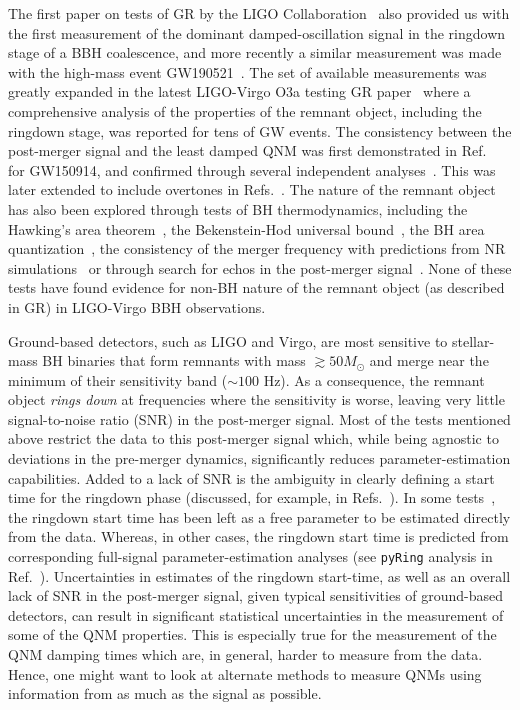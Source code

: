 \documentclass[twocolumn,prd,aps,superscriptaddress,preprintnumbers,tightenlines,showpacs,nofootinbib,eqsecnum,amsfonts,amsmath]{revtex4-1}
\begin{document}
The first paper on tests of GR by the LIGO Collaboration~\cite{TheLIGOScientific:2016src} also provided us with the first measurement of the dominant damped-oscillation signal in the ringdown stage of a BBH
coalescence, and more recently a similar measurement was made with the high-mass event GW190521~\cite{Abbott:2020tfl,Abbott:2020mjq}. The set of available measurements was greatly expanded in the latest LIGO-Virgo O3a testing GR paper~\cite{Abbott:2020jks} where a comprehensive analysis of the properties of the remnant object, including the ringdown stage, was reported for tens of GW events. The consistency between the post-merger signal and the least damped QNM was first demonstrated in
Ref.~\cite{TheLIGOScientific:2016src} for GW150914, and confirmed through several independent analyses~\cite{Brito:2018rfr,Carullo:2019flw,Isi:2019aib,CalderonBustillo:2020tjf}. This was later extended to include
overtones in Refs.~\cite{Giesler:2019uxc,Isi:2019aib,Abbott:2020jks}.  The nature of the remnant object has also been explored through tests of BH thermodynamics, including the Hawking's area
theorem~\cite{Cabero:2017avf,Isi:2020tac}, the Bekenstein-Hod universal bound~\cite{Carullo:2021yxh}, the BH area quantization~\cite{Foit:2016uxn,Laghi:2020rgl}, the consistency of the merger frequency with predictions from NR simulations~\cite{Carullo:2018gah} or through search for echos in the post-merger signal~\cite{Nielsen:2018lkf,Tsang:2019zra,Lo:2018sep,Abedi:2018npz,Abedi:2020sgg,Testa:2018bzd}.  None of these tests have found evidence for non-BH nature of the remnant
object (as described in GR) in LIGO-Virgo BBH observations.

Ground-based detectors, such as LIGO and Virgo, are most sensitive to
stellar-mass BH binaries that form remnants with mass $\gtrsim 50 M_{\odot}$ and merge near the
minimum of their sensitivity band ($\sim 100$ Hz). As a consequence, the
remnant object \textit{rings down} at frequencies where the sensitivity is worse, leaving
very little signal-to-noise ratio (SNR) in the
post-merger signal. Most of the tests mentioned above restrict the data to this post-merger signal which, while being agnostic to deviations in the pre-merger dynamics, significantly reduces parameter-estimation capabilities. Added to a lack of SNR is the ambiguity in clearly defining a start time for the ringdown phase (discussed, for example, in Refs.~\cite{Berti:2007fi,Baibhav:2017jhs,Bhagwat:2017tkm}). In some tests~\cite{Carullo:2018gah,Carullo:2019flw}, the ringdown start time has been left as a
free parameter to be estimated directly from the data. Whereas, in other cases, the ringdown start time is predicted from corresponding full-signal parameter-estimation analyses (see \texttt{pyRing} analysis in Ref.~\cite{Abbott:2020jks}). Uncertainties
in estimates of the ringdown start-time, as well as an overall lack of
SNR in the post-merger signal, given typical sensitivities of
ground-based detectors, can result in significant statistical uncertainties in the measurement of some of the QNM properties. This is especially true for the measurement of the QNM damping times which are, in general, harder to measure from the data. Hence, one might want to look at alternate methods to measure QNMs using information from as much as the signal as possible.
\end{document}
